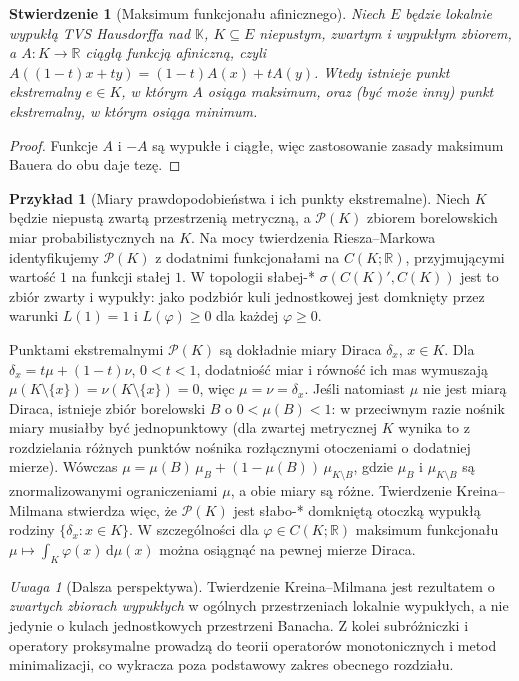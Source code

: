 \documentclass[11pt,a4paper]{article}
\numberwithin{equation}{section}
\theoremstyle{plain}
\newtheorem{stwierdzenie}[twierdzenie]{Stwierdzenie}
\theoremstyle{definition}
\newtheorem{przyklad}[twierdzenie]{Przykład}
\theoremstyle{remark}
\newtheorem{uwaga}[twierdzenie]{Uwaga}
\newcommand{\R}{\mathbb R}
\newcommand{\K}{\mathbb K}
\begin{document}
\begin{stwierdzenie}[Maksimum funkcjonału afinicznego]
\label{prop:affine-extreme16}
Niech $E$ będzie lokalnie wypukłą TVS Hausdorffa nad $\K$,
$K\subseteq E$ niepustym, zwartym i wypukłym zbiorem,
a $A:K\to\R$ ciągłą funkcją afiniczną,
czyli $A((1-t)x+ty)=(1-t)A(x)+tA(y)$.
Wtedy istnieje punkt ekstremalny $e\in K$, w którym
$A$ osiąga maksimum, oraz (być może inny) punkt ekstremalny,
w którym osiąga minimum.
\end{stwierdzenie}
\begin{proof}
Funkcje $A$ i $-A$ są wypukłe i ciągłe,
więc zastosowanie zasady maksimum Bauera do obu daje tezę.
\end{proof}

\begin{przyklad}[Miary prawdopodobieństwa i ich punkty ekstremalne]
\label{ex:prob-measures16}
Niech $K$ będzie niepustą zwartą przestrzenią metryczną,
a $\mathcal P(K)$ zbiorem borelowskich miar probabilistycznych na $K$.
Na mocy twierdzenia Riesza--Markowa identyfikujemy
$\mathcal P(K)$ z dodatnimi funkcjonałami na $C(K;\R)$,
przyjmującymi wartość $1$ na funkcji stałej $1$.
W topologii słabej-* $\sigma(C(K)',C(K))$ jest to zbiór
zwarty i wypukły: jako podzbiór kuli jednostkowej
jest domknięty przez warunki
$L(1)=1$ i $L(\varphi)\ge0$ dla każdej $\varphi\ge0$.

Punktami ekstremalnymi $\mathcal P(K)$ są dokładnie
miary Diraca $\delta_x$, $x\in K$.
Dla $\delta_x=t\mu+(1-t)\nu$, $0<t<1$, dodatniość
miar i równość ich mas wymuszają
$\mu(K\setminus\{x\})=\nu(K\setminus\{x\})=0$,
więc $\mu=\nu=\delta_x$.
Jeśli natomiast $\mu$ nie jest miarą Diraca,
istnieje zbiór borelowski $B$ o
$0<\mu(B)<1$: w przeciwnym razie nośnik miary
musiałby być jednopunktowy (dla zwartej metrycznej $K$
wynika to z rozdzielania różnych punktów nośnika
rozłącznymi otoczeniami o dodatniej mierze).
Wówczas
$\mu=\mu(B)\,\mu_B+(1-\mu(B))\,\mu_{K\setminus B}$,
gdzie $\mu_B$ i $\mu_{K\setminus B}$ są znormalizowanymi
ograniczeniami $\mu$, a obie miary są różne.
Twierdzenie Kreina--Milmana stwierdza więc, że
$\mathcal P(K)$ jest słabo-* domkniętą otoczką wypukłą
rodziny $\{\delta_x:x\in K\}$.
W szczególności dla $\varphi\in C(K;\R)$
maksimum funkcjonału $\mu\mapsto\int_K\varphi(x)\,\mathrm d\mu(x)$
można osiągnąć na pewnej mierze Diraca.
\end{przyklad}

\begin{uwaga}[Dalsza perspektywa]
Twierdzenie Kreina--Milmana jest rezultatem o \emph{zwartych
zbiorach wypukłych} w ogólnych przestrzeniach lokalnie wypukłych,
a nie jedynie o kulach jednostkowych przestrzeni Banacha.
Z kolei subróżniczki i operatory proksymalne prowadzą
do teorii operatorów monotonicznych i metod minimalizacji,
co wykracza poza podstawowy zakres obecnego rozdziału.
\end{uwaga}
\end{document}
